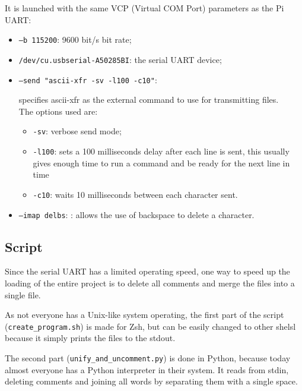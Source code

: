 \documentclass[a4paper, 12pt]{article}
\begin{document}
It is launched with the same VCP (Virtual COM Port) parameters as the Pi UART:
\begin{itemize}
    \item \texttt{--b 115200}: 9600 bit/s bit rate;
    \item \texttt{/dev/cu.usbserial-A50285BI}: the serial UART device;
    \item \texttt{--send "ascii-xfr -sv -l100 -c10"}:
    
    specifies ascii-xfr as the external
    command to use for transmitting files. \\
    The options used are: 
    \begin{itemize}
        \item \texttt{-sv}: verbose send mode;
        \item \texttt{-l100}: sets a 100 milliseconds delay after each line is sent,
        this usually gives enough time to run a command and be
        ready for the next line in time
        \item \texttt{-c10}: waits 10 milliseconds between each character sent.
    \end{itemize}
    \item \texttt{--imap delbs}: : allows the use of backspace to delete a character.
\end{itemize}

\subsection{Script}
Since the serial UART has a limited operating speed, one way to speed up the loading of the entire project is to delete all comments and merge the files into a single file.

As not everyone has a Unix-like system operating, the first part of the script (\texttt{create\_program.sh}) is made for Zsh, but can be easily changed to other shelsl because it simply prints the files to the stdout. 



The second part (\texttt{unify\_and\_uncomment.py}) is done in Python, because today almost everyone has a Python interpreter in their system. It reads from stdin, deleting comments and joining all words by separating them with a single space.




\printbibliography
\end{document}
